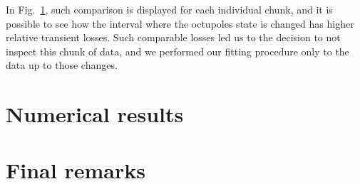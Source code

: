 In Fig.~\ref{fig:wire_loss_comp}, such comparison is displayed for each individual chunk, and it is possible to see how the interval where the octupoles state is changed has higher relative transient losses. Such comparable losses led us to the decision to not inspect this chunk of data, and we performed our fitting procedure only to the data up to those changes.

\begin{figure}
    \centering
    \caption{}
    \label{fig:wire_loss_comp}
\end{figure}



\section{Numerical results}

\section{Final remarks}